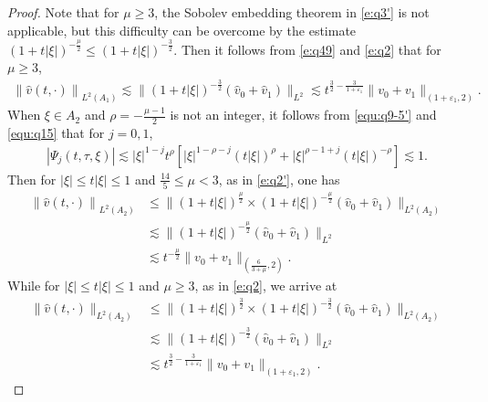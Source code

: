 \documentclass[11pt,twoside]{article}
\newcommand{\f}{\frac}
\theoremstyle{plain}
\theoremstyle{definition}
\theoremstyle{remark}
\numberwithin{equation}{section}
\begin{document}
\begin{proof}
Note that for $\mu\geq 3$, the Sobolev embedding theorem in \eqref{e:q3'} is not applicable, but this difficulty can be overcome by the estimate $(1+t|\xi|)^{-\frac{\mu}{2}} \le (1+t|\xi|)^{-\frac{3}{2}}$. Then it follows from \eqref{e:q49} and \eqref{e:q2} that for $\mu\geq 3$,
\begin{equation}\label{e:q50}
\begin{aligned}
\left\|\hat{v}(t, \cdot)\right\|_{L^2(A_1)} \lesssim\big\|(1+t|\xi|)^{-\f32}(\hat{v}_{0}+\hat{v}_{1})\big\|_{L^{2}} \lesssim t^{\f32-\f{3}{1+\varepsilon_1}}\|v_0+v_1\|_{(1+\varepsilon_1, 2)}.
\end{aligned}
\end{equation}
When $\xi\in A_2$ and $\rho=-\f{\mu-1}{2}$ is not an integer, it follows from \eqref{equ:q9-5'} and \eqref{equ:q15} that for $j=0,1$,
\begin{equation}\label{e:q51}
\begin{aligned}
|\Psi_j(t,\tau,\xi)|
\lesssim |\xi|^{1-j} t^{\rho}\left[|\xi|^{1-\rho-j}(t|\xi|)^{\rho}+|\xi|^{\rho-1+j}(t|\xi|)^{-\rho}\right]
\lesssim 1.
\end{aligned}
\end{equation}
Then for $|\xi|\leq t|\xi| \leq 1$ and $\f{14}{5}\leq\mu<3$, as in \eqref{e:q2'}, one has
\begin{equation}\label{e:q52'}
\begin{aligned}
\left\|\hat{v}(t, \cdot)\right\|_{L^2(A_2)} & \leq\big\|(1+t|\xi|)^{\f{\mu}{2}}\times(1+t|\xi|)^{-\f{\mu}{2}}(\hat{v}_{0}+\hat{v}_{1})\big\|_{L^{2}(A_2)} \\
&\lesssim\big\|(1+t|\xi|)^{-\f{\mu}{2}}(\hat{v}_{0}+\hat{v}_{1})\big\|_{L^{2}}\\
&\lesssim t^{-\f{\mu}{2}}\|v_0+v_1\|_{(\f{6}{3+\mu}, 2)}.
\end{aligned}
\end{equation}
While for $|\xi|\leq t|\xi| \leq 1$ and $\mu\geq3$, as in \eqref{e:q2}, we arrive at
\begin{equation}\label{e:q52}
\begin{aligned}
\big\|\hat{v}(t, \cdot)\big\|_{L^2(A_2)} & \leq\big\|(1+t|\xi|)^{\f32}\times(1+t|\xi|)^{-\f32}(\hat{v}_{0}+\hat{v}_{1})\big\|_{L^{2}(A_2)} \\
&\lesssim\big\|(1+t|\xi|)^{-\f32}(\hat{v}_{0}+\hat{v}_{1})\big\|_{L^{2}}\\
&\lesssim t^{\f32-\f{3}{1+\varepsilon_1}}\|v_0+v_1\|_{(1+\varepsilon_1, 2)}.
\end{aligned}
\end{equation}



\end{proof}
\end{document}
